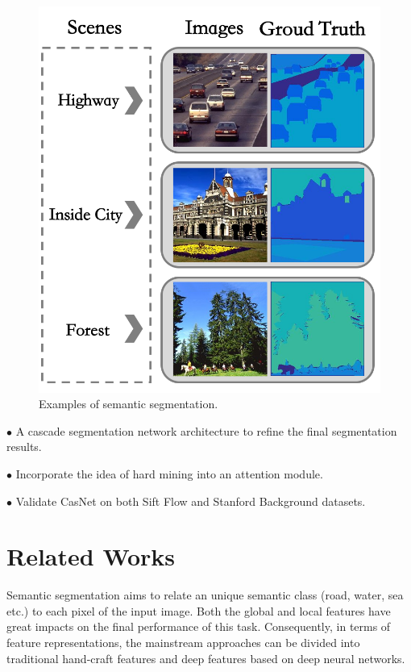 \documentclass[10.5pt,compsoc]{TsT}
\newcommand{\upcite}[1]{\superscript{\textsuperscript{\cite{#1}}}}
\theoremstyle{mystyle}
\newcommand{\upcite}[1]{\textsuperscript{\cite{#1}}}
\begin{document}
{\begin{figure}
\centering
\includegraphics[width=0.95\columnwidth]{fig1.png}
\caption{Examples of semantic segmentation.}
\label{fig:example}
\end{figure} 


\noindent
  $\bullet$ A cascade segmentation network architecture to refine the final segmentation results.
  
\noindent
  $\bullet$ Incorporate the idea of hard mining into an attention module.
  
\noindent
  $\bullet$ Validate CasNet on both Sift Flow\upcite{6} and Stanford Background\upcite{7} datasets.


\section{Related Works}
\label{s:Related}
\noindent
Semantic segmentation aims to relate an unique semantic class (road, water, sea etc.) to each pixel of the input image. Both the global and local features have great impacts on the final performance of this task. Consequently, in terms of feature representations, the mainstream approaches can be divided into traditional hand-craft features and deep features based on deep neural networks. 

}
\end{document}
